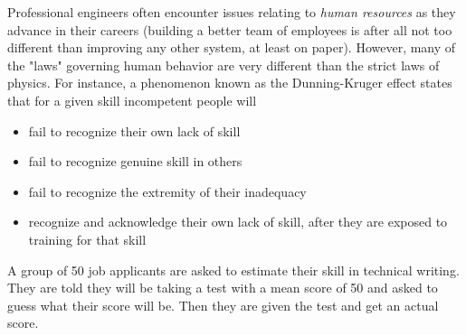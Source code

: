 \documentclass[addpoints]{examsetup}
\begin{document}




\examCoverPage

\begin{questions}



\question

Professional engineers often encounter issues relating to \textit{human resources} as they advance in their careers
(building a better team of employees is after all not too different than improving any other system, at least on paper).
However, many of the "laws" governing human behavior are very different than the strict laws of physics.
For instance, a phenomenon known as the Dunning-Kruger effect states that for a given skill incompetent people will
\begin{itemize}
   \item fail to recognize their own lack of skill
   \item fail to recognize genuine skill in others
   \item fail to recognize the extremity of their inadequacy
   \item recognize and acknowledge their own lack of skill, after they are exposed to training for that skill
\end{itemize}

A group of 50 job applicants are asked to estimate their skill in technical writing. 
They are told they will be taking a test with a mean score of 50 and asked to guess what their score will be.
Then they are given the test and get an actual score. 



\end{questions}
\end{document}
